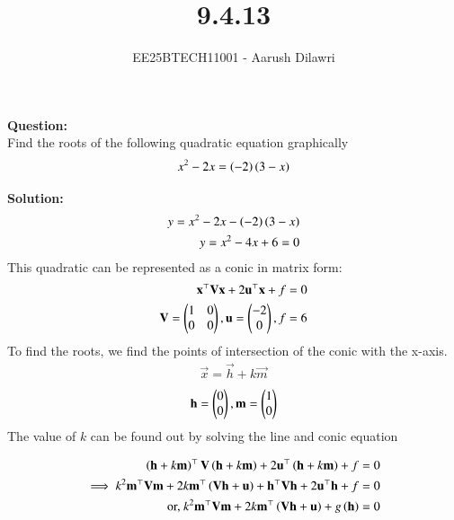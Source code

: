 \documentclass[journal]{IEEEtran}
\begin{document}

\vspace{3cm}

\title{9.4.13}
\author{EE25BTECH11001 - Aarush Dilawri}
{\let\newpage\relax\maketitle}

\renewcommand{\thefigure}{\theenumi}
\renewcommand{\thetable}{\theenumi}
\setlength{\intextsep}{10pt} %
\textbf{Question:}\\
Find the roots of the following quadratic equation graphically
\begin{align}
    x^2 -2x = \left(-2\right)\left(3-x\right)
\end{align}

\textbf{Solution:}\\
\begin{align}
    y = x^2 -2x - \left(-2\right)\left(3-x\right)\\
    y = x^2 - 4x + 6 =0
\end{align}
This quadratic can be represented as a conic in matrix form:
\begin{align}
   \mathbf{x}^{\top}\mathbf{V}\mathbf{x} + 2\mathbf{u}^{\top}\mathbf{x} + f = 0\\ 
   \mathbf{V} = \begin{pmatrix}1 & 0 \\ 0 & 0\end{pmatrix} , \mathbf{u} = \begin{pmatrix}-2 \\0\end{pmatrix} ,
   f = 6
\end{align}
To find the roots, we find the points of intersection of the conic with the x-axis.
\begin{align}
\vec{x} = \vec{h} + k\vec{m}    
\end{align}
\begin{align}
\mathbf{h}=\begin{pmatrix}0 \\ 0\end{pmatrix}, \mathbf{m} = \begin{pmatrix}1 \\ 0\end{pmatrix}
\end{align}
The value of $k$ can be found out by solving the line and conic equation

\begin{align}
\left(\mathbf{h} + k \mathbf{m}\right)^{\top} \mathbf{V} \left(\mathbf{h} + k \mathbf{m}\right) + 2\mathbf{u}^{\top} \left(\mathbf{h} + k \mathbf{m}\right) + f &= 0 \\
\implies k^{2} \mathbf{m}^{\top}\mathbf{V}\mathbf{m} + 2k \mathbf{m}^{\top} \left(\mathbf{V}\mathbf{h} + \mathbf{u}\right) + \mathbf{h}^{\top}\mathbf{V}\mathbf{h} + 2\mathbf{u}^{\top}\mathbf{h} + f &= 0 \\
\text{or, } k^{2} \mathbf{m}^{\top}\mathbf{V}\mathbf{m} + 2k \mathbf{m}^{\top} \left(\mathbf{V}\mathbf{h} + \mathbf{u}\right) + g\left(\mathbf{h}\right) &= 0
\end{align}
\end{document}
